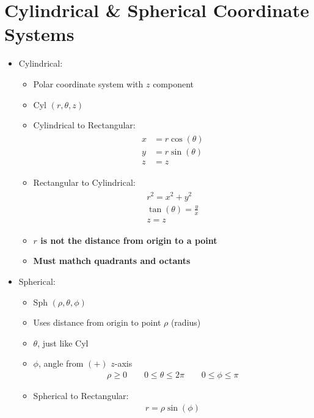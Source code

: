 \documentclass{article}
\begin{document}
\section{Cylindrical \& Spherical Coordinate Systems}
\begin{itemize}
  \item Cylindrical: 
  \begin{itemize}
    \item Polar coordinate system with $z$ component
    \item Cyl $(r, \theta, z)$
    \item Cylindrical to Rectangular:
    \begin{align}
      \begin{split}
        x &= r\cos(\theta) \\
        y &= r\sin(\theta) \\
        z &= z
      \end{split} \label{cylindrical-xyz-equations}
    \end{align}
    \item Rectangular to Cylindrical:
    \begin{align}
      \begin{split}
        r^2 = x^2 + y^2 \\
        \tan(\theta) = \frac{y}{x} \\
        z = z
      \end{split}
    \end{align}
    \item \textbf{$r$ is not the distance from origin to a point}
    \item \textbf{Must mathch quadrants and octants}
  \end{itemize}
  \item Spherical:
    \begin{itemize}
      \item Sph $(\rho, \theta, \phi)$
      \item Uses distance from origin to point $\rho$ (radius)
      \item $\theta$, just like Cyl
      \item $\phi$, angle from $(+)$ $z$-axis
      \begin{align}
        \rho\geq 0 \qquad 0\leq\theta\leq 2\pi \qquad 0\leq\phi\leq\pi
      \end{align}
      \item Spherical to Rectangular:
      \begin{align}
        r = \rho\sin(\phi) \label{spherical-r-equation}

\end{align}
\end{itemize}
\end{itemize}
\end{document}
